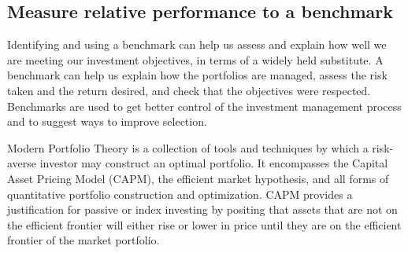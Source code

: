 \documentclass[12pt,letterpaper,english]{article}
\begin{document}
\subsection{Measure relative performance to a benchmark}

Identifying and using a benchmark can help us assess and explain how well we are
meeting our investment objectives, in terms of a widely held substitute.
A benchmark can help us explain how the portfolios are managed,
assess the risk taken and the return desired, and check that
the objectives were respected. Benchmarks are used to get better control of the
investment management process and to suggest ways to improve selection.

Modern Portfolio Theory is a collection of tools and techniques
by which a risk-averse investor may construct an optimal portfolio.
It encompasses the Capital Asset Pricing Model (CAPM), the efficient
market hypothesis, and all forms of quantitative portfolio construction
and optimization. CAPM provides a justification for passive or index
investing by positing that assets that are not on the efficient frontier
will either rise or lower in price until they are on the efficient
frontier of the market portfolio.
\end{document}
